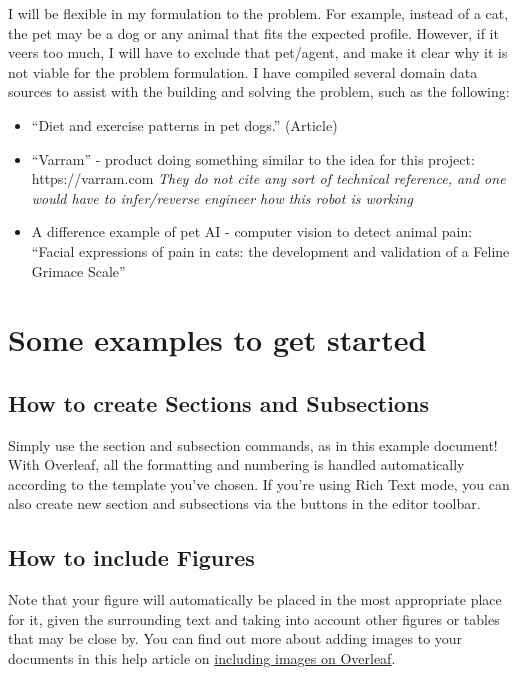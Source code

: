 \documentclass{article}
\begin{document}
I will be flexible in my formulation to the problem. For example, instead of a cat, the pet may be a dog or any animal that fits the expected profile. However, if it veers too much, I will have to exclude that pet/agent, and make it clear why it is not viable for the problem formulation. I have compiled several domain data sources to assist with the building and solving the problem, such as the following:
\begin{itemize}
    \item ``Diet and exercise patterns in pet dogs.'' (Article) \cite{slater1995diet}
    \item ``Varram'' - product doing something similar to the idea for this project: https://varram.com \cite{varram}
    \textit{They do not cite any sort of technical reference, and one would have to infer/reverse engineer how this robot is working}
    \item A difference example of pet AI - computer vision to detect animal pain: ``Facial expressions of pain in cats: the development and validation of a Feline Grimace Scale''  \cite{evangelista2019}
\end{itemize}

\section{Some examples to get started}

\subsection{How to create Sections and Subsections}

Simply use the section and subsection commands, as in this example document! With Overleaf, all the formatting and numbering is handled automatically according to the template you've chosen. If you're using Rich Text mode, you can also create new section and subsections via the buttons in the editor toolbar.

\subsection{How to include Figures}

Note that your figure will automatically be placed in the most appropriate place for it, given the surrounding text and taking into account other figures or tables that may be close by. You can find out more about adding images to your documents in this help article on \href{https://www.overleaf.com/learn/how-to/Including_images_on_Overleaf}{including images on Overleaf}.
\end{document}
